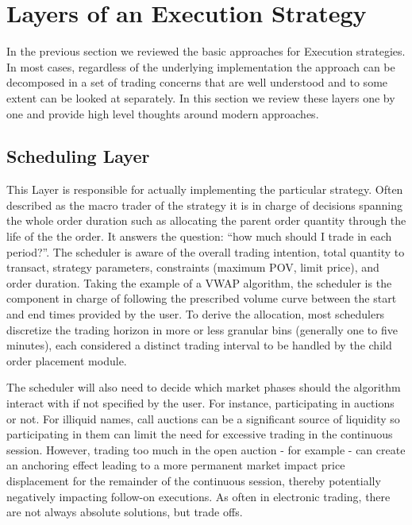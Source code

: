 \section{Layers of an Execution Strategy}

In the previous section we reviewed the basic approaches for Execution strategies. In most cases, regardless of the underlying implementation the approach can be decomposed in a set of trading concerns that are well understood and to some extent can be looked at separately. In this section we review these layers one by one and provide high level thoughts around modern approaches.

\subsection{Scheduling Layer}

This Layer is responsible for actually implementing the particular strategy. Often described as the macro trader of the strategy it is in charge of decisions spanning the whole order duration such as allocating the parent order quantity through the life of the the order. It answers the question: “how much should I trade in each period?”. The scheduler is aware of the overall trading intention, total quantity to transact, strategy parameters, constraints (maximum POV, limit price), and order duration. Taking the example of a VWAP algorithm, the scheduler is the component in charge of following the prescribed volume curve between the start and end times provided by the user. To derive the allocation, most schedulers discretize the trading horizon in more or less granular bins (generally one to five minutes), each considered a distinct trading interval to be handled by the child order placement module.

The scheduler will also need to decide which market phases should the algorithm interact with if not specified by the user. For instance, participating in auctions or not. For illiquid names, call auctions can be a significant source of liquidity so participating in them can limit the need for excessive trading in the continuous session. However, trading too much in the open auction - for example - can create an anchoring effect leading to a more permanent market impact price displacement for the remainder of the continuous session, thereby potentially negatively impacting follow-on executions. As often in electronic trading, there are not always absolute solutions, but trade offs.

